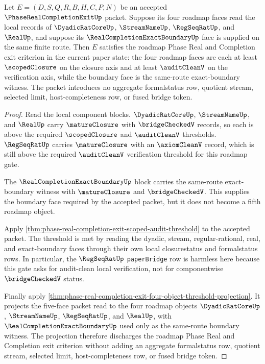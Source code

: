 \begin{theorem}
\label{thm:phase-real-completion-exit-current-local-status-witness}
Let $E=(D,S,Q,R,B,H,C,P,N)$ be an accepted $\PhaseRealCompletionExitUp$ packet. Suppose its four roadmap faces read the local records of $\DyadicRatCoreUp$, $\StreamNameUp$, $\RegSeqRatUp$, and $\RealUp$, and suppose its $\RealCompletionExactBoundaryUp$ face is supplied on the same finite route. Then $E$ satisfies the roadmap Phase Real and Completion exit criterion in the current paper state: the four roadmap faces are each at least $\scopedClosure$ on the closure axis and at least $\auditCleanV$ on the verification axis, while the boundary face is the same-route exact-boundary witness. The packet introduces no aggregate formalstatus row, quotient stream, selected limit, host-completeness row, or fused bridge token.
\end{theorem}
\begin{proof}
Read the local component blocks. $\DyadicRatCoreUp$, $\StreamNameUp$, and $\RealUp$ carry $\matureClosure$ with $\bridgeCheckedV$ records, so each is above the required $\scopedClosure$ and $\auditCleanV$ thresholds. $\RegSeqRatUp$ carries $\matureClosure$ with an $\axiomCleanV$ record, which is still above the required $\auditCleanV$ verification threshold for this roadmap gate.

The $\RealCompletionExactBoundaryUp$ block carries the same-route exact-boundary witness with $\matureClosure$ and $\bridgeCheckedV$. This supplies the boundary face required by the accepted packet, but it does not become a fifth roadmap object.

Apply \autoref{thm:phase-real-completion-exit-scoped-audit-threshold} to the accepted packet. The threshold is met by reading the dyadic, stream, regular-rational, real, and exact-boundary faces through their own local closurestatus and formalstatus rows. In particular, the $\RegSeqRatUp$ \texttt{paperBridge} row is harmless here because this gate asks for audit-clean local verification, not for componentwise $\bridgeCheckedV$ status.

Finally apply \autoref{thm:phase-real-completion-exit-four-object-threshold-projection}. It projects the five-face packet read to the four roadmap objects $\DyadicRatCoreUp$, $\StreamNameUp$, $\RegSeqRatUp$, and $\RealUp$, with $\RealCompletionExactBoundaryUp$ used only as the same-route boundary witness. The projection therefore discharges the roadmap Phase Real and Completion exit criterion without adding an aggregate formalstatus row, quotient stream, selected limit, host-completeness row, or fused bridge token.
\end{proof}

